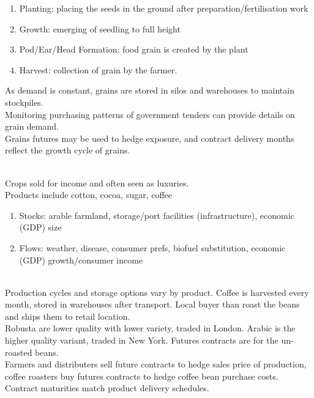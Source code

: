\begin{remark} 
\begin{enumerate}[label=\roman*.]
\setlength{\itemsep}{0pt}
\item Planting: placing the seeds in the ground after preparation/fertilisation work
\item Growth: emerging of seedling to full height
\item Pod/Ear/Head Formation: food grain is created by the plant
\item Harvest: collection of grain by the farmer.
\end{enumerate}
As demand is constant, grains are stored in silos and warehouses to maintain stockpiles.\\
Monitoring purchasing patterns of government tenders can provide details on grain demand.\\
Grains futures may be used to hedge exposure, and contract delivery months reflect the growth cycle of grains.
\end{remark}

\begin{remark}  \\
Crops sold for income and often seen as luxuries.\\
Products include cotton, cocoa, sugar, coffee
\begin{enumerate}[label=\roman*.]
\setlength{\itemsep}{0pt}
\item Stocks: arable farmland, storage/port facilities (infrastructure), economic (GDP) size
\item Flows: weather, disease, consumer prefs, biofuel substitution, economic (GDP) growth/consumer income
\end{enumerate}
\end{remark}

\begin{remark} \\
Production cycles and storage options vary by product. Coffee is harvested every month, stored in warehouses after transport. Local buyer than roast the beans and ships them to retail location.\\
Robusta are lower quality with lower variety, traded in London. Arabic is the higher quality variant, traded in New York. Futures contracts are for the un-roasted beans.\\
Farmers and distributers sell future contracts to hedge sales price of production, coffee roasters buy futures contracts to hedge coffee bean purchase costs. Contract maturities match product delivery schedules.
\end{remark}

